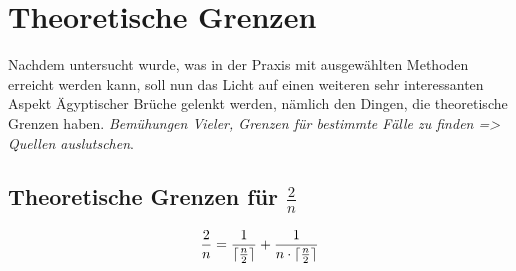 \section{Theoretische Grenzen}
Nachdem untersucht wurde, was in der Praxis mit ausgewählten Methoden erreicht werden kann, soll nun das Licht auf einen weiteren sehr interessanten Aspekt Ägyptischer Brüche gelenkt werden, nämlich den Dingen, die theoretische Grenzen haben. \emph{Bemühungen Vieler, Grenzen für bestimmte Fälle zu finden => Quellen auslutschen}.

\subsection{Theoretische Grenzen für $\frac{2}{n}$}
$$\frac{2}{n} = \frac{1}{\lceil \frac{n}{2} \rceil} + \frac{1}{n \cdot \lceil \frac{n}{2} \rceil}$$